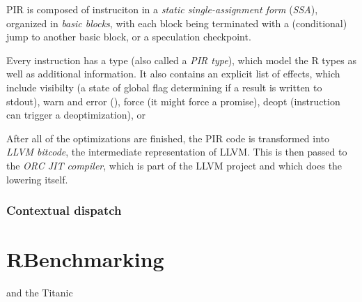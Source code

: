 PIR is composed of instruciton in a \textit{static single-assignment form} (\textit{SSA}), organized in \textit{basic blocks}, with each block being terminated with a (conditional) jump to another basic block, or a speculation checkpoint.

Every instruction has a type (also called a \textit{PIR type}), which model the R types as well as additional information. It also contains an explicit list of effects, which include visibilty (a state of global flag determining if a result is written to stdout), warn and error (\todo{\dots}), force (it might force a promise), deopt (instruction can trigger a deoptimization), or


After all of the optimizations are finished, the PIR code is transformed into \textit{LLVM bitcode}, the intermediate representation of LLVM. This is then passed to the \textit{ORC JIT compiler}, which is part of the LLVM project and which does the lowering itself.

\subsubsection{Contextual dispatch}

\section{RBenchmarking}
and the Titanic
